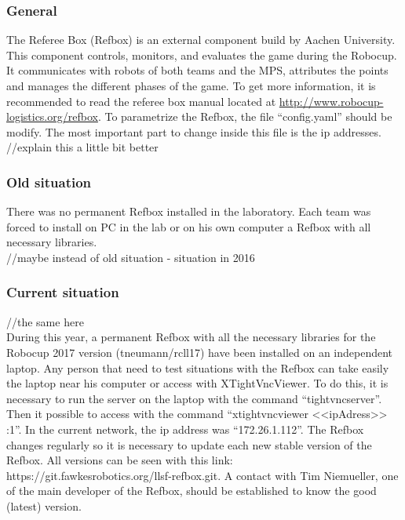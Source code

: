 
\subsubsection{General}

The Referee Box (Refbox) is an external component build by Aachen University. This component controls, monitors, and evaluates the game during the Robocup. It communicates with robots of both teams and the MPS, attributes the points and manages the different phases of the game. To get more information, it is recommended to read the referee box manual located at \url{http://www.robocup-logistics.org/refbox}. To parametrize the Refbox, the file “config.yaml” should be modify. The most important part to change inside this file is the ip addresses. \\

//explain this a little bit better \\

\subsubsection{Old situation}

There was no permanent Refbox installed in the laboratory. Each team was forced to install on PC in the lab or on his own computer a Refbox with all necessary libraries. \\

//maybe instead of old situation - situation in 2016 

\subsubsection{Current situation}
//the same here \\

During this year, a permanent Refbox with all the necessary libraries for the Robocup 2017 version (tneumann/rcll17) have been installed on an independent laptop. Any person that need to test situations with the Refbox can take easily the laptop near his computer or access with XTightVncViewer.  To do this, it is necessary to run the server on the laptop with the command “tightvncserver”. Then it possible to access with the command “xtightvncviewer <<ipAdress>> :1”.  In the current network, the ip address was “172.26.1.112”. The Refbox changes regularly so it is necessary to update each new stable version of the Refbox. All versions can be seen with this link: https://git.fawkesrobotics.org/llsf-refbox.git. A contact with Tim Niemueller, one of the main developer of the Refbox, should be established to know the good (latest) version. \\

